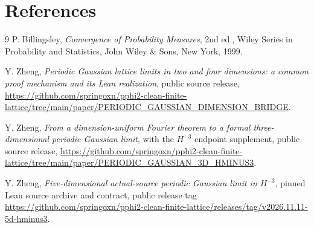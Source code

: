 \section*{References}
\begin{thebibliography}{9}
P. Billingsley, \emph{Convergence of Probability Measures}, 2nd ed., Wiley Series in Probability and Statistics, John Wiley \& Sons, New York, 1999.

Y. Zheng, \emph{Periodic Gaussian lattice limits in two and four dimensions: a common proof mechanism and its Lean realization}, public source release, \url{https://github.com/springoxn/pphi2-clean-finite-lattice/tree/main/paper/PERIODIC_GAUSSIAN_DIMENSION_BRIDGE}.

Y. Zheng, \emph{From a dimension-uniform Fourier theorem to a formal three-dimensional periodic Gaussian limit}, with the $H^{-3}$ endpoint supplement, public source release, \url{https://github.com/springoxn/pphi2-clean-finite-lattice/tree/main/paper/PERIODIC_GAUSSIAN_3D_HMINUS3}.

Y. Zheng, \emph{Five-dimensional actual-source periodic Gaussian limit in $H^{-3}$}, pinned Lean source archive and contract, public release tag \url{https://github.com/springoxn/pphi2-clean-finite-lattice/releases/tag/v2026.11.11-5d-hminus3}.
\end{thebibliography}
